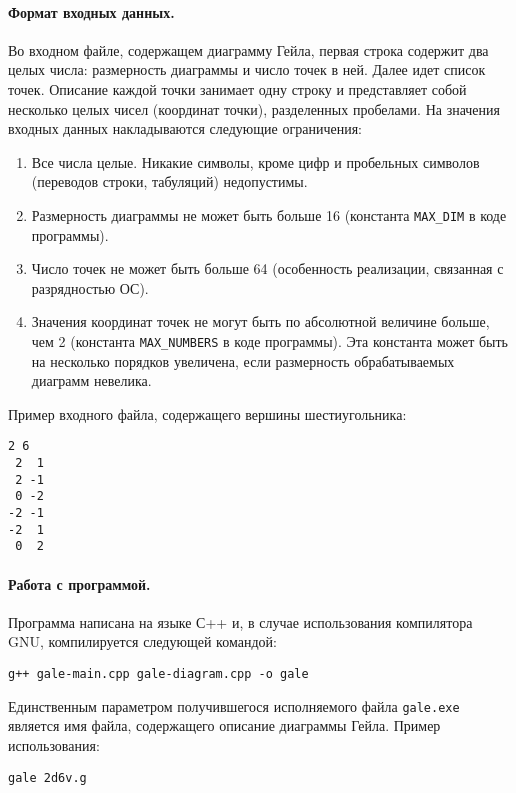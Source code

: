 \documentclass[12pt]{article}
\begin{document}
\paragraph{Формат входных данных.}
Во входном файле, содержащем диаграмму Гейла, первая строка содержит два целых числа: размерность диаграммы и число точек в ней. Далее идет список точек. Описание каждой точки занимает одну строку и представляет собой несколько целых чисел (координат точки), разделенных пробелами. На значения входных данных накладываются следующие ограничения:
\begin{enumerate}
	\item Все числа целые. Никакие символы, кроме цифр и пробельных символов (переводов строки, табуляций) недопустимы.
	\item Размерность диаграммы не может быть больше 16 (константа \texttt{MAX\_DIM} в коде программы).
	\item Число точек не может быть больше 64 (особенность реализации, связанная с разрядностью ОС).
	\item Значения координат точек не могут быть по абсолютной величине больше, чем 2 (константа \texttt{MAX\_NUMBERS} в коде программы). Эта константа может быть на несколько порядков увеличена, если размерность обрабатываемых диаграмм невелика.
\end{enumerate}
Пример входного файла, содержащего вершины шестиугольника:
\begin{verbatim}
2 6
 2  1
 2 -1
 0 -2
-2 -1
-2  1
 0  2
\end{verbatim}

\paragraph{Работа с программой.}
Программа написана на языке С++ и, в случае использования компилятора GNU, компилируется следующей командой:
\begin{verbatim}
g++ gale-main.cpp gale-diagram.cpp -o gale
\end{verbatim}
Единственным параметром получившегося исполняемого файла \texttt{gale.exe} является имя файла, содержащего описание диаграммы Гейла. Пример использования:
\begin{verbatim}
gale 2d6v.g
\end{verbatim}
\end{document}
